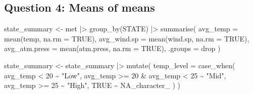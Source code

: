 \documentclass[
  letterpaper,
  DIV=11,
  numbers=noendperiod]{scrartcl}
\newenvironment{Shaded}{\begin{snugshade}}{\end{snugshade}}
\newcommand{\AttributeTok}[1]{\textcolor[rgb]{0.40,0.45,0.13}{#1}}
\newcommand{\ConstantTok}[1]{\textcolor[rgb]{0.56,0.35,0.01}{#1}}
\newcommand{\DecValTok}[1]{\textcolor[rgb]{0.68,0.00,0.00}{#1}}
\newcommand{\FunctionTok}[1]{\textcolor[rgb]{0.28,0.35,0.67}{#1}}
\newcommand{\NormalTok}[1]{\textcolor[rgb]{0.00,0.23,0.31}{#1}}
\newcommand{\OtherTok}[1]{\textcolor[rgb]{0.00,0.23,0.31}{#1}}
\newcommand{\SpecialCharTok}[1]{\textcolor[rgb]{0.37,0.37,0.37}{#1}}
\newcommand{\StringTok}[1]{\textcolor[rgb]{0.13,0.47,0.30}{#1}}
\begin{document}
\subsection{Question 4: Means of means}\label{question-4-means-of-means}

\begin{Shaded}
\begin{Highlighting}[]
\NormalTok{state\_summary }\OtherTok{\textless{}{-}}\NormalTok{ met }\SpecialCharTok{|\textgreater{}}
  \FunctionTok{group\_by}\NormalTok{(STATE) }\SpecialCharTok{|\textgreater{}}
  \FunctionTok{summarise}\NormalTok{(}
    \AttributeTok{avg\_temp =} \FunctionTok{mean}\NormalTok{(temp, }\AttributeTok{na.rm =} \ConstantTok{TRUE}\NormalTok{),}
    \AttributeTok{avg\_wind.sp =} \FunctionTok{mean}\NormalTok{(wind.sp, }\AttributeTok{na.rm =} \ConstantTok{TRUE}\NormalTok{),}
    \AttributeTok{avg\_atm.press =} \FunctionTok{mean}\NormalTok{(atm.press, }\AttributeTok{na.rm =} \ConstantTok{TRUE}\NormalTok{),}
    \AttributeTok{.groups =} \StringTok{\textquotesingle{}drop\textquotesingle{}}
\NormalTok{  )}
\end{Highlighting}
\end{Shaded}

\begin{Shaded}
\begin{Highlighting}[]
\NormalTok{state\_summary }\OtherTok{\textless{}{-}}\NormalTok{ state\_summary }\SpecialCharTok{|\textgreater{}}
  \FunctionTok{mutate}\NormalTok{(}
    \AttributeTok{temp\_level =} \FunctionTok{case\_when}\NormalTok{(}
\NormalTok{      avg\_temp }\SpecialCharTok{\textless{}} \DecValTok{20} \SpecialCharTok{\textasciitilde{}} \StringTok{"Low"}\NormalTok{,}
\NormalTok{      avg\_temp }\SpecialCharTok{\textgreater{}=} \DecValTok{20} \SpecialCharTok{\&}\NormalTok{ avg\_temp }\SpecialCharTok{\textless{}} \DecValTok{25} \SpecialCharTok{\textasciitilde{}} \StringTok{"Mid"}\NormalTok{,}
\NormalTok{      avg\_temp }\SpecialCharTok{\textgreater{}=} \DecValTok{25} \SpecialCharTok{\textasciitilde{}} \StringTok{"High"}\NormalTok{,}
      \ConstantTok{TRUE} \SpecialCharTok{\textasciitilde{}} \ConstantTok{NA\_character\_}
\NormalTok{    )}
\NormalTok{  )}
\end{Highlighting}
\end{Shaded}
\end{document}
